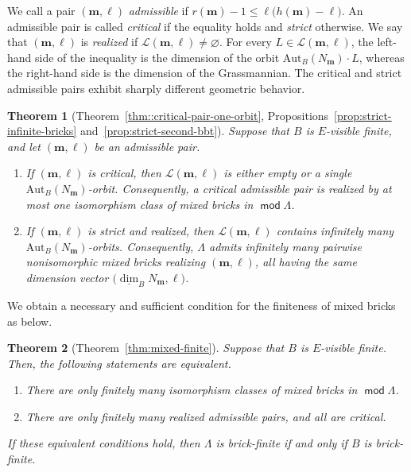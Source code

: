 \documentclass[a4,12pt]{amsart}
\numberwithin{equation}{section} %
\def\mod{\operatorname{\mathsf{mod}}}
\def\Aut{\mathrm{Aut}} %
\newtheorem{theorem*}{Theorem} %
\theoremstyle{definition} %
\begin{document}
We call a pair $(\mathbf{m},\ell)$ \emph{admissible} if $r(\mathbf{m})-1 \leq \ell\bigl(h(\mathbf{m})-\ell\bigr)$. An admissible pair is called \emph{critical} if the equality holds and \emph{strict} otherwise. We say that $(\mathbf{m},\ell)$ is \emph{realized} if $\mathcal{L}(\mathbf{m},\ell)\neq\varnothing$. For every $L\in\mathcal{L}(\mathbf{m},\ell)$, the left-hand side of the inequality is the dimension of the orbit $\Aut_B(N_{\mathbf{m}})\cdot L$, whereas the right-hand side is the dimension of the Grassmannian. The critical and strict admissible pairs exhibit sharply different geometric
behavior.

\begin{theorem*}[Theorem~\ref{thm::critical-pair-one-orbit}, Propositions~\ref{prop:strict-infinite-bricks}
and~\ref{prop:strict-second-bbt}]
Suppose that $B$ is $E$-visible finite, and let $(\mathbf{m},\ell)$ be an admissible pair.
\begin{enumerate}
\item If $(\mathbf{m},\ell)$ is critical, then $\mathcal{L}(\mathbf{m},\ell)$ is either empty or a single $\Aut_B(N_{\mathbf{m}})$-orbit. Consequently, a critical admissible pair is realized by at most one isomorphism class of mixed bricks in $\mod \Lambda$.

\item If $(\mathbf{m},\ell)$ is strict and realized, then $\mathcal{L}(\mathbf{m},\ell)$ contains infinitely many $\Aut_B(N_{\mathbf{m}})$-orbits. Consequently, $\Lambda$ admits infinitely many pairwise nonisomorphic mixed bricks realizing $(\mathbf{m},\ell)$, all having the same dimension vector $\bigl(\underline{\dim}_B N_{\mathbf{m}},\ell\bigr)$. 
\end{enumerate}
\end{theorem*}

We obtain a necessary and sufficient condition for the finiteness of mixed bricks as below.

\begin{theorem*}[Theorem~\ref{thm:mixed-finite}]
Suppose that $B$ is $E$-visible finite. Then, the following statements are equivalent.
\begin{enumerate}
\item There are only finitely many isomorphism classes of mixed bricks in $\mod \Lambda$.

\item There are only finitely many realized admissible pairs, and all are critical.
\end{enumerate}
If these equivalent conditions hold, then $\Lambda$ is brick-finite if and only if $B$ is brick-finite.
\end{theorem*}
\end{document}
